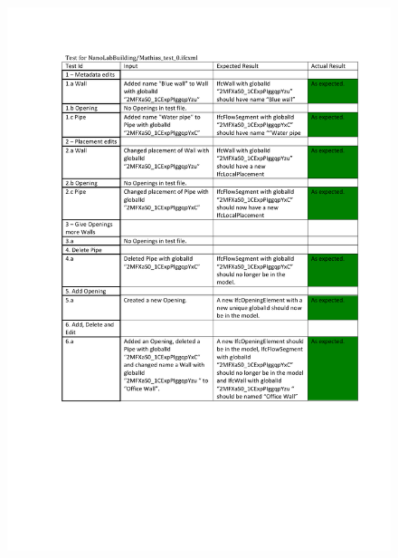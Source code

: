\begin{figure}
    \centering
        \centerline{\includegraphics[width=150mm]{images/Test2.pdf}}
    \caption{}
    \label{fig:test2}
\end{figure}
